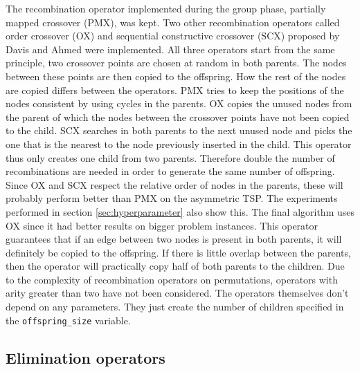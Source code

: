 \documentclass[a4paper,10pt]{article}
\newcommand{\ReplaceMe}[1]{{\color{blue}#1}}
\begin{document}
The recombination operator implemented during the group phase, partially mapped crossover (PMX), was kept. Two other recombination operators called order crossover (OX) and sequential constructive crossover (SCX) proposed by Davis \cite{davis} and Ahmed \cite{ahmed} were implemented. All three operators start from the same principle, two crossover points are chosen at random in both parents. The nodes between these points are then copied to the offspring. How the rest of the nodes are copied differs between the operators. PMX tries to keep the positions of the nodes consistent by using cycles in the parents. OX copies the unused nodes from the parent of which the nodes between the crossover points have not been copied to the child. SCX searches in both parents to the next unused node and picks the one that is the nearest to the node previously inserted in the child. This operator thus only creates one child from two parents. Therefore double the number of recombinations are needed in order to generate the same number of offspring.\\
Since OX and SCX respect the relative order of nodes in the parents, these will probably perform better than PMX on the asymmetric TSP. The experiments performed in section \ref{sec:hyperparameter} also show this. The final algorithm uses OX since it had better results on bigger problem instances. This operator guarantees that if an edge between two nodes is present in both parents, it will definitely be copied to the offspring. If there is little overlap between the parents, then the operator will practically copy half of both parents to the children. Due to the complexity of recombination operators on permutations, operators with arity greater than two have not been considered. The operators themselves don't depend on any parameters. They just create the number of children specified in the \texttt{offspring\_size} variable.

\subsection{Elimination operators}

\end{document}
